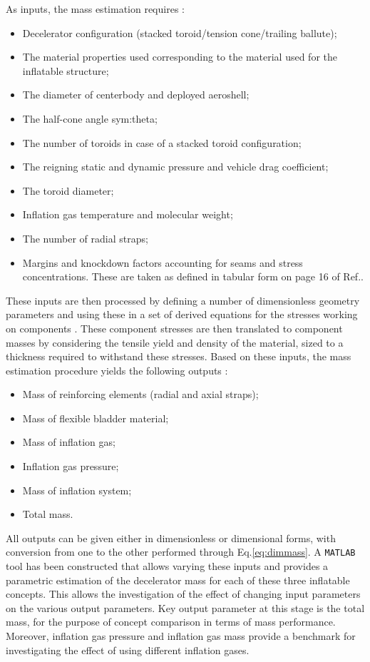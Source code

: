 As inputs, the mass estimation requires \cite{Samareh2011}:
\begin{itemize}
\item Decelerator configuration (stacked toroid/tension cone/trailing ballute);
\item The material properties used corresponding to the material used for the inflatable structure; 
\item The diameter of centerbody and deployed aeroshell;
\item The half-cone angle \gls{sym:theta};
\item The number of toroids in case of a stacked toroid configuration;
\item The reigning static and dynamic pressure and vehicle drag coefficient;
\item The toroid diameter;
\item Inflation gas temperature and molecular weight;
\item The number of radial straps;
\item Margins and knockdown factors accounting for seams and stress concentrations. These are taken as defined in tabular form on page 16 of Ref.\cite{Samareh2011}.
\end{itemize}
These inputs are then processed by defining a number of dimensionless geometry parameters and using these in a set of derived equations for the stresses working on components \cite[p.12-p.14]{Samareh2011}. These component stresses are then translated to component masses by considering the tensile yield and density of the material, sized to a thickness required to withstand these stresses. Based on these inputs, the mass estimation procedure yields the following outputs \cite{Samareh2011}:
\begin{itemize}
\item Mass of reinforcing elements (radial and axial straps);
\item Mass of flexible bladder material;
\item Mass of inflation gas;
\item Inflation gas pressure;
\item Mass of inflation system;
\item Total mass.
\end{itemize}
All outputs can be given either in dimensionless or dimensional forms, with conversion from one to the other performed through Eq.\ref{eq:dimmass}. A \texttt{MATLAB} tool has been constructed that allows varying these inputs and provides a parametric estimation of the decelerator mass for each of these three inflatable concepts. This allows the investigation of the effect of changing input parameters on the various output parameters. Key output parameter at this stage is the total mass, for the purpose of concept comparison in terms of mass performance. Moreover, inflation gas pressure and inflation gas mass provide a benchmark for investigating the effect of using different inflation gases.


